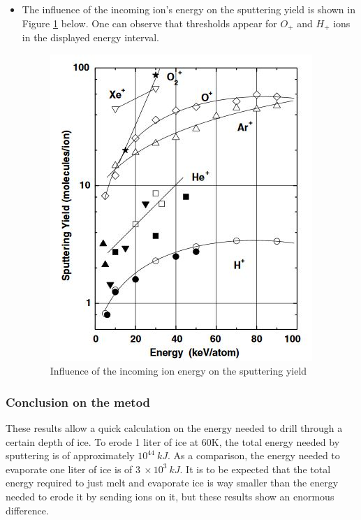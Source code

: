 \begin{itemize}
    \item {The influence of the incoming ion's energy on the sputtering yield is shown in Figure \ref{sputteringenergy} below. One can observe that thresholds appear for $O_{+}$ and $H_{+}$ ions in the displayed energy interval.}
    
\begin{figure}[htb]
\begin{center}
\includegraphics{Paul/sputteringenergy.JPG}
\end{center}
\caption{Influence of the incoming ion energy on the sputtering yield}
\label{sputteringenergy}
\end{figure}

\end{itemize}

\subsubsection{Conclusion on the metod}

These results allow a quick calculation on the energy needed to drill through a certain depth of ice. To erode 1 liter of ice at 60K, the total energy needed by sputtering is of approximately $10^{44}~kJ$. As a comparison, the energy needed to evaporate one liter of ice is of $3~\times10^{3}~kJ$. It is to be expected that the total energy required to just melt and evaporate ice is way smaller than the energy needed to erode it by sending ions on it, but these results show an enormous difference.

